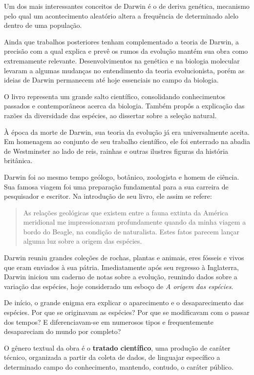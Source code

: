 \documentclass[11pt]{extarticle}
\begin{document}
Um dos mais interessantes conceitos de Darwin é o de deriva genética,  mecanismo pelo qual um acontecimento aleatório altera a frequência de
determinado alelo dentro de uma população.

Ainda que trabalhos posteriores tenham complementado a teoria de Darwin,
a precisão com a qual explica e prevê os rumos da evolução mantém sua obra como
extremamente relevante.
Desenvolvimentos na genética e na biologia molecular levaram a algumas mudanças
no entendimento da teoria evolucionista, porém as ideias de Darwin permanecem
até hoje essenciais no campo da biologia.


O livro representa um grande salto científico, consolidando conhecimentos
passados e contemporâneos acerca da biologia.
Também propôs a explicação das razões da diversidade das espécies, ao
dissertar sobre a seleção natural.

À época da morte de Darwin, sua teoria da evolução já era universalmente
aceita. 
Em homenagem ao conjunto de seu trabalho científico, ele foi enterrado na
abadia de Westminster ao lado de reis, rainhas e outras ilustres figuras da
história britânica. 

Darwin foi ao mesmo tempo geólogo, botânico, zoologista e homem de ciência. 
Sua famosa viagem foi uma preparação fundamental para a sua carreira de
pesquisador e escritor. Na introdução de seu livro, ele assim se refere:  

\begin{quote}
As relações
geológicas que existem entre a fauna extinta da América meridional me
impressionaram profundamente quando da minha viagem a bordo do Beagle, na
condição de naturalista.  Estes fatos parecem lançar alguma luz sobre a origem
das espécies.
\end{quote} 

Darwin reuniu grandes coleções de rochas, plantas
e animais, eres fósseis e vivos que eram enviados à sua pátria. 
Imediatamente após seu regresso à Inglaterra, Darwin iniciou um caderno de
notas sobre a evolução, reunindo dados sobre a variação das espécies,
hoje considerado um esboço de \textit{A origem das espécies}. 

De início, o grande enigma era explicar o aparecimento e o desaparecimento das
espécies. Por que se originavam as espécies? Por que se modificavam com o passar dos tempos? E diferenciavam-se em numerosos tipos e frequentemente desapareciam do mundo por completo?

O gênero textual da obra é o \textbf{tratado científico}, uma produção de caráter
técnico, organizada a partir da coleta de dados, de
linguajar específico a determinado campo do conhecimento,  mantendo, contudo,
o caráter público.
\end{document}
